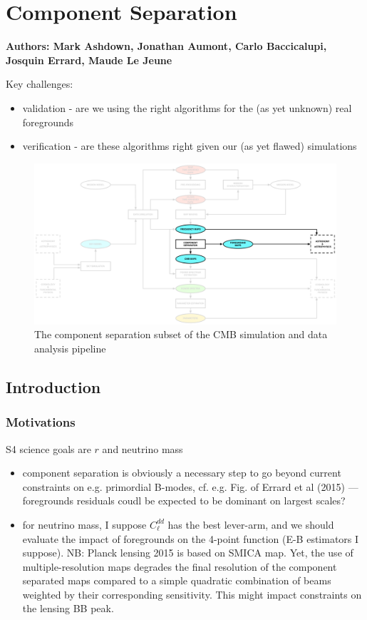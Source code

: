 
\section{Component Separation}

\textbf{ Authors: Mark Ashdown, Jonathan Aumont, Carlo Baccicalupi, Josquin Errard, Maude Le Jeune}

Key challenges:
\begin{itemize}
\item validation - are we using the right algorithms for the (as yet unknown) real foregrounds
\item verification - are these algorithms right given our (as yet flawed) simulations
\end{itemize}

\begin{figure}[htbp]
\centering
\includegraphics[width=1\textwidth]{Analysis/cs}
\caption{The component separation subset of the CMB simulation and data analysis pipeline}
\label{default}
\end{figure}


\subsection{Introduction}


\subsubsection{Motivations}

S4 science goals are $r$ and neutrino mass
\begin{itemize}
	\item component separation is obviously a necessary step to go beyond current constraints on e.g. primordial B-modes, cf. e.g. Fig.  of Errard et al (2015) --- foregrounds residuals coudl be expected to be dominant on largest scales?
	\item for neutrino mass, I suppose $C_\ell^{dd}$ has the best lever-arm, and we should evaluate the impact of foregrounds on the 4-point function (E-B estimators I suppose). NB: Planck lensing 2015 is based on SMICA map. Yet, the use of multiple-resolution maps degrades the final resolution of the component separated maps compared to a simple quadratic combination of beams weighted by their corresponding sensitivity. This might impact constraints on the lensing BB peak.
\end{itemize}

